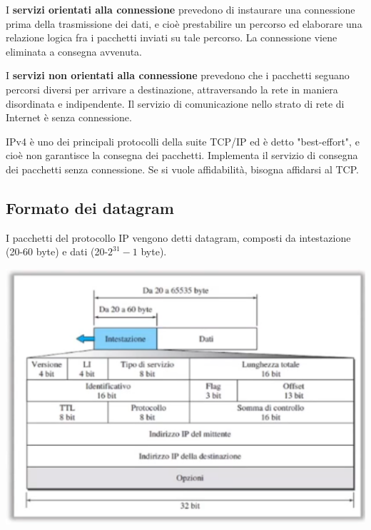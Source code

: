     \vspace{3mm}
    
    I \textbf{servizi orientati alla connessione} prevedono di instaurare una connessione prima della trasmissione dei dati, e cioè prestabilire un percorso ed elaborare una relazione logica fra i pacchetti inviati su tale percorso. La connessione viene eliminata a consegna avvenuta.
    
    I \textbf{servizi non orientati alla connessione} prevedono che i pacchetti seguano percorsi diversi per arrivare a destinazione, attraversando la rete in maniera disordinata e indipendente. Il servizio di comunicazione nello strato di rete di Internet è senza connessione.
    
    \vspace{3mm}
    
    IPv4 è uno dei principali protocolli della suite TCP/IP ed è detto "best-effort", e cioè non garantisce la consegna dei pacchetti. Implementa il servizio di consegna dei pacchetti senza connessione. Se si vuole affidabilità, bisogna affidarsi al TCP.
    
    \subsection{Formato dei datagram}
    
    I pacchetti del protocollo IP vengono detti datagram, composti da intestazione (20-60 byte) e dati (20-$2^31 - 1$ byte).
    
    \begin{center}
        \includegraphics[scale=0.5]{images/IPv4.png}
    \end{center}
    
